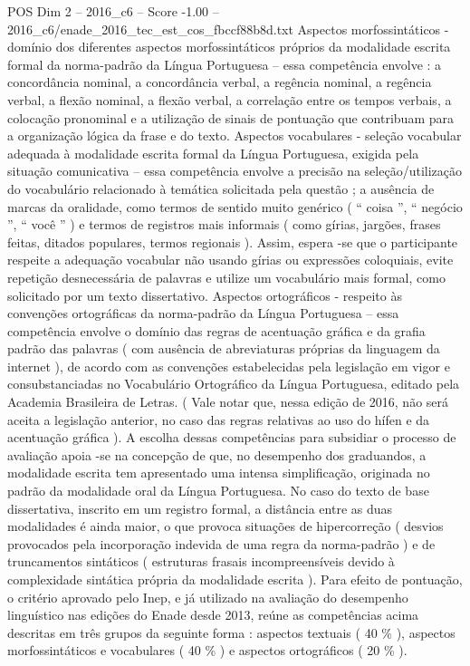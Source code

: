 \begin{textsample}{POS Dim 2 – 2016\_c6 – Score -1.00 – 2016\_c6/enade\_2016\_tec\_est\_cos\_fbccf88b8d.txt}
Aspectos morfossintáticos - domínio dos diferentes aspectos morfossintáticos próprios da modalidade escrita formal da norma-padrão da Língua Portuguesa – essa competência envolve : a concordância nominal, a concordância verbal, a regência nominal, a regência verbal, a flexão nominal, a flexão verbal, a correlação entre os tempos verbais, a colocação pronominal e a utilização de sinais de pontuação que contribuam para a organização lógica da frase e do texto.
Aspectos vocabulares - seleção vocabular adequada à modalidade escrita formal da Língua Portuguesa, exigida pela situação comunicativa – essa competência envolve a precisão na seleção/utilização do vocabulário relacionado à temática solicitada pela questão ; a ausência de marcas da oralidade, como termos de sentido muito genérico ( “ coisa ”, “ negócio ”, “ você ” ) e termos de registros mais informais ( como gírias, jargões, frases feitas, ditados populares, termos regionais ).
Assim, espera -se que o participante respeite a adequação vocabular não usando gírias ou expressões coloquiais, evite repetição desnecessária de palavras e utilize um vocabulário mais formal, como solicitado por um texto dissertativo.
Aspectos ortográficos - respeito às convenções ortográficas da norma-padrão da Língua Portuguesa – essa competência envolve o domínio das regras de acentuação gráfica e da grafia padrão das palavras ( com ausência de abreviaturas próprias da linguagem da internet ), de acordo com as convenções estabelecidas pela legislação em vigor e consubstanciadas no Vocabulário Ortográfico da Língua Portuguesa, editado pela Academia Brasileira de Letras. ( Vale notar que, nessa edição de 2016, não será aceita a legislação anterior, no caso das regras relativas ao uso do hífen e da acentuação gráfica ).
A escolha dessas competências para subsidiar o processo de avaliação apoia -se na concepção de que, no desempenho dos graduandos, a modalidade escrita tem apresentado uma intensa simplificação, originada no padrão da modalidade oral da Língua Portuguesa.
No caso do texto de base dissertativa, inscrito em um registro formal, a distância entre as duas modalidades é ainda maior, o que provoca situações de hipercorreção ( desvios provocados pela incorporação indevida de uma regra da norma-padrão ) e de truncamentos sintáticos ( estruturas frasais incompreensíveis devido à complexidade sintática própria da modalidade escrita ).
Para efeito de pontuação, o critério aprovado pelo Inep, e já utilizado na avaliação do desempenho linguístico nas edições do Enade desde 2013, reúne as competências acima descritas em três grupos da seguinte forma : aspectos textuais ( 40 \% ), aspectos morfossintáticos e vocabulares ( 40 \% ) e aspectos ortográficos ( 20 \% ).

\end{textsample}
